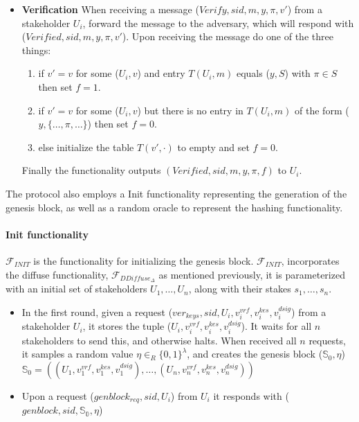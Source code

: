 \begin{itemize}
    \item \textbf{Verification} When receiving a message ($Verify, sid, m, y, \pi, v'$) from a stakeholder $U_i$, forward the message to the adversary, which will respond with ($Verified, sid, m, y, \pi, v'$). Upon receiving the message do one of the three things:
    \begin{enumerate}
        \item if $v' = v$ for some ($U_i, v$) and entry $T(U_i, m)$ equals ($y, S$) with $\pi \in S$ then set $f = 1$. 
        \item if $v' = v$ for some ($U_i, v$) but there is no entry in $T(U_i, m)$ of the form ($y, \{\dots, \pi, \dots\}$) then set $f = 0$.
        \item else initialize the table $T(v', \cdot)$ to empty and set $f = 0$.
    \end{enumerate}
    Finally the functionality outputs $(Verified, sid, m, y, \pi, f)$ to $U_i$.
\end{itemize}

The protocol also employs a Init functionality representing the generation of the genesis block, as well as a random oracle to represent the hashing functionality.

\paragraph{Init functionality} $\mathcal{F}_{INIT}$ is the functionality for initializing the genesis block. $\mathcal{F}_ {INIT}$, incorporates the diffuse functionality, $\mathcal{F}_{DDiffuse_{\Delta}}$ as mentioned previously, it is parameterized with an initial set of stakeholders $U_1, \dots, U_n$, along with their stakes $s_1, \dots, s_n$. 
\begin{itemize}
    \item In the first round, given a request ($ver_{keys}, sid, U_i, v^{vrf}_i, v^{kes}_i, v^{dsig}_i$) from a stakeholder $U_i$, it stores the tuple ($U_i, v^{vrf}_i, v^{kes}_i, v^{dsig}_i$). It waits for all $n$ stakeholders to send this, and otherwise halts. When received all $n$ requests, it samples a random value $\eta \in_R \{0,1\}^{\lambda}$, and creates the genesis block ($\mathbb{S}_0, \eta$) \\ $\mathbb{S}_0 = ((U_1, v^{vrf}_1, v^{kes}_1, v^{dsig}_1), \dots, (U_n, v^{vrf}_n, v^{kes}_n, v^{dsig}_n))$
    \item Upon a request ($genblock_{req}, sid, U_i$) from $U_i$ it responds with ($genblock, sid, \mathbb{S_0}, \eta$)
\end{itemize}

